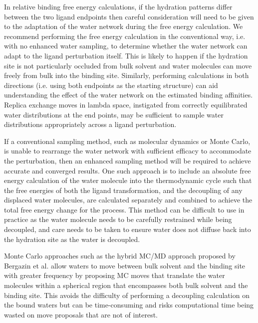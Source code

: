 \documentclass[9pt,bestpractices,pubversion]{livecoms}
\begin{document}
In relative binding free energy calculations, if the hydration patterns differ between the two ligand endpoints then careful consideration will need to be given to the adaptation of the water network during the free energy calculation. We recommend performing the free energy calculation in the conventional way, i.e. with no enhanced water sampling, to determine whether the water network can adapt to the ligand perturbation itself. This is likely to happen if the hydration site is not particularly occluded from bulk solvent and water molecules can move freely from bulk into the binding site. Similarly, performing calculations in both directions (i.e. using both endpoints as the starting structure) can aid understanding the effect of the water network on the estimated binding affinities. Replica exchange moves in lambda space, instigated from correctly equilibrated water distributions at the end points, may be sufficient to sample water distributions appropriately across a ligand perturbation.

If a conventional sampling method, such as molecular dynamics or Monte Carlo, is unable to rearrange the water network with sufficient efficacy to accommodate the perturbation, then an enhanced sampling method will be required to achieve accurate and converged results. One such approach is to include an absolute free energy calculation of the water molecule into the thermodynamic cycle\cite{ross2020enhancing, hamelberg2004standard, barillari2007classification, yu2008free, ge2022abfewat} such that the free energies of both the ligand transformation, and the decoupling of any displaced water molecules, are calculated separately and combined to achieve the total free energy change for the process. This method can be difficult to use in practice as the water molecule needs to be carefully restrained while being decoupled, and care needs to be taken to ensure water does not diffuse back into the hydration site as the water is decoupled.

Monte Carlo approaches such as the hybrid MC/MD approach proposed by Bergazin et al.\cite{bergazin2021enhancing, ben-shalom2021fast, ge2022enhancing} allow waters to move between bulk solvent and the binding site with greater frequency by proposing MC moves that translate the water molecules within a spherical region that encompasses both bulk solvent and the binding site. This avoids the difficulty of performing a decoupling calculation on the bound waters but can be time-consuming and risks computational time being wasted on move proposals that are not of interest.
\end{document}
